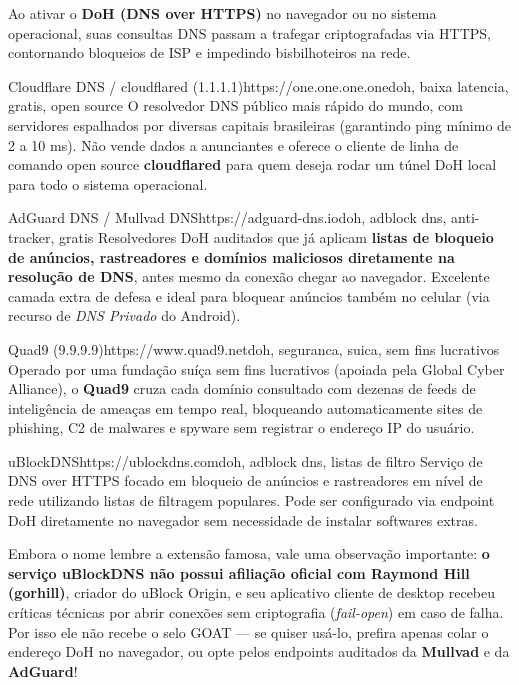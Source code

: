 \documentclass{pousadaguide}
\begin{document}
Ao ativar o \textbf{DoH (DNS over HTTPS)} no navegador ou no sistema operacional, suas consultas DNS passam a trafegar criptografadas via HTTPS, contornando bloqueios de ISP e impedindo bisbilhoteiros na rede.

\begin{ferramenta}[goat,logo=cloudflare]{Cloudflare DNS / cloudflared (1.1.1.1)}{https://one.one.one.one}{doh, baixa latencia, gratis, open source}
O resolvedor DNS público mais rápido do mundo, com servidores espalhados por diversas capitais brasileiras (garantindo ping mínimo de 2 a 10 ms). Não vende dados a anunciantes e oferece o cliente de linha de comando open source \textbf{cloudflared} para quem deseja rodar um túnel DoH local para todo o sistema operacional. 
\end{ferramenta}

\begin{ferramenta}[recomendado,logo=adguard,logo2=mullvad]{AdGuard DNS / Mullvad DNS}{https://adguard-dns.io}{doh, adblock dns, anti-tracker, gratis}
Resolvedores DoH auditados que já aplicam \textbf{listas de bloqueio de anúncios, rastreadores e domínios maliciosos diretamente na resolução de DNS}, antes mesmo da conexão chegar ao navegador. Excelente camada extra de defesa e ideal para bloquear anúncios também no celular (via recurso de \emph{DNS Privado} do Android). 
\end{ferramenta}

\begin{ferramenta}[recomendado,logo=quad9]{Quad9 (9.9.9.9)}{https://www.quad9.net}{doh, seguranca, suica, sem fins lucrativos}
Operado por uma fundação suíça sem fins lucrativos (apoiada pela Global Cyber Alliance), o \textbf{Quad9} cruza cada domínio consultado com dezenas de feeds de inteligência de ameaças em tempo real, bloqueando automaticamente sites de phishing, C2 de malwares e spyware sem registrar o endereço IP do usuário. 
\end{ferramenta}

\begin{ferramenta}[logo=ublockdns]{uBlockDNS}{https://ublockdns.com}{doh, adblock dns, listas de filtro}
Serviço de DNS over HTTPS focado em bloqueio de anúncios e rastreadores em nível de rede utilizando listas de filtragem populares. Pode ser configurado via endpoint DoH diretamente no navegador sem necessidade de instalar softwares extras. 
\end{ferramenta}

\begin{nota}
Embora o nome lembre a extensão famosa, vale uma observação importante: \textbf{o serviço uBlockDNS não possui afiliação oficial com Raymond Hill (gorhill)}, criador do uBlock Origin, e seu aplicativo cliente de desktop recebeu críticas técnicas por abrir conexões sem criptografia (\emph{fail-open}) em caso de falha. Por isso ele não recebe o selo GOAT — se quiser usá-lo, prefira apenas colar o endereço DoH no navegador, ou opte pelos endpoints auditados da \textbf{Mullvad} e da \textbf{AdGuard}!
\end{nota}
\end{document}
